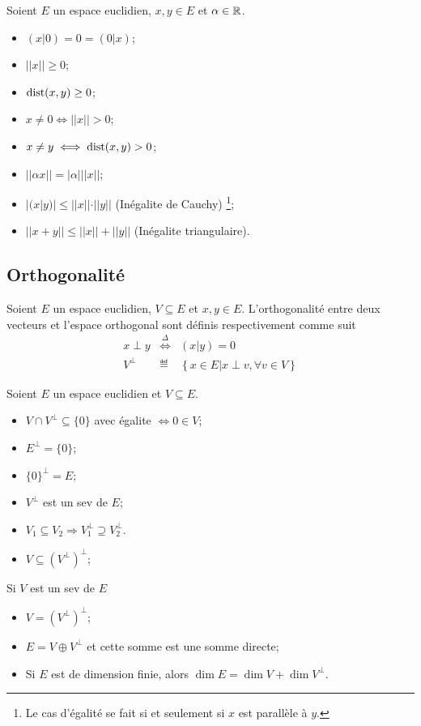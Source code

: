 \begin{myprop}
	Soient $E$ un espace euclidien, $x,y \in E$ et $\alpha \in \mathbb{R}$.
	\begin{itemize}
		\item $(x|0) = 0 = (0|x)$;
		\item $||x|| \geq 0$;
		\item $\operatorname{dist}(x, y) \geq 0$;
		\item $x \neq 0 \iff ||x|| > 0$;
		\item $x \neq y \iff \operatorname{dist}(x, y) > 0$;
		\item $||\alpha x|| = |\alpha|||x||$;
		\item $|(x | y)| \leq ||x||\cdot||y||$ (Inégalite de Cauchy)
			\footnote{Le cas d'égalité se fait si et seulement si $x$ est parallèle à $y$.};
		\item $||x + y|| \leq ||x|| + ||y||$ (Inégalite triangulaire).
	\end{itemize}
\end{myprop}

\subsection{Orthogonalité}

\begin{mydef}
	Soient $E$ un espace euclidien, $V \subseteq E$ et $x,y \in E$.
	L'orthogonalité entre deux vecteurs et l'espace orthogonal sont définis respectivement comme suit
	\begin{eqnarray*}
		x \perp y & \stackrel{\Delta}{\Leftrightarrow} & (x|y) = 0\\
		V^{\perp} & \eqdef & \left\{x \in E | x \perp v, \forall v \in V\right\}
	\end{eqnarray*}
\end{mydef}

\begin{myprop}
	Soient $E$ un espace euclidien et $V \subseteq E$.
	\begin{itemize}
		\item $V \cap V^{\perp} \subseteq \{0\}$ avec égalite $\iff 0 \in V$;
		\item $E^{\perp} = \{0\}$;
		\item $\{0\}^{\perp} = E$;
		\item $V^{\perp}$ est un sev de $E$;
		\item $V_1 \subseteq V_2 \Rightarrow V_1^{\perp} \supseteq V_2^{\perp}$.
		\item $V \subseteq \left( V^{\perp} \right) ^{\perp}$;
	\end{itemize}
	Si $V$ est un sev de $E$
	\begin{itemize}
		\item $V = \left(V^\perp \right)^\perp$;
		\item $E = V \oplus V^{\perp}$ et cette somme est une somme directe;
			\item
			Si $E$ est de dimension finie, alors
			$\dim E = \dim V + \dim V^{\perp}$.
	\end{itemize}
\end{myprop}


